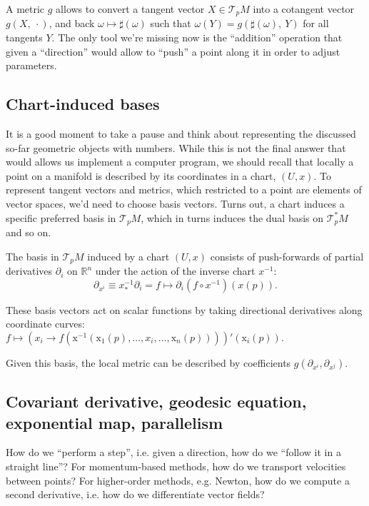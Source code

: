 A metric \( g \) allows to convert a tangent vector \( X\in\mathcal{T}_p M\)
into a cotangent vector \( g(X,~\cdot) \), and back \( \omega\mapsto \sharp(\omega) \)
such that \( \omega(Y) = g\left(\sharp(\omega),~Y\right) \) for all tangents \( Y \).
The only tool we're missing now is the ``addition'' operation that given a
``direction'' would allow to ``push'' a point along it in order to adjust
parameters.

\subsection*{Chart-induced bases}

It is a good moment to take a pause and think about representing the discussed
so-far geometric objects with numbers. While this is not the final answer that
would allows us implement a computer program, we should recall that locally a
point on a manifold is described by its coordinates in a chart, \( (U, x) \).
To represent tangent vectors and metrics, which restricted to a point are
elements of vector spaces, we'd need to choose basis vectors. Turns out,
a chart induces a specific preferred basis in \( \mathcal{T}_pM \),
which in turns induces the dual basis on \( \mathcal{T}^*_pM \) and so on.

The basis in \( \mathcal{T}_pM \) induced by a chart \( (U, x) \) consists of
push-forwards of partial derivatives \( \partial_i \) on \(\mathbb{R}^n\) under
the action of the inverse chart \( x^{-1} \):
\[ \partial_{x^i} \equiv x^{-1}_*\partial_i = f\mapsto \partial_i (f \circ x^{-1})(x(p)). \]

These basis vectors act on scalar functions by taking directional derivatives
along coordinate curves: \( f \mapsto \left(x_i \to
f\left(\mathrm{x}^{-1}\left(\mathrm{x}_1(p), \ldots, x_i, \ldots,
\mathrm{x}_n(p)\right)\right)\right)'(\mathrm{x}_i(p)). \)

Given this basis, the local metric can be described by coefficients
\( g(\partial_{x^i}, \partial_{x^j}) \).

\subsection*{Covariant derivative, geodesic equation, exponential map, parallelism}

How do we ``perform a step'', i.e. given a direction, how do we ``follow it in
a straight line''? For momentum-based methods, how do we transport velocities
between points? For higher-order methods, e.g. Newton, how do we compute a
second derivative, i.e. how do we differentiate vector fields?

